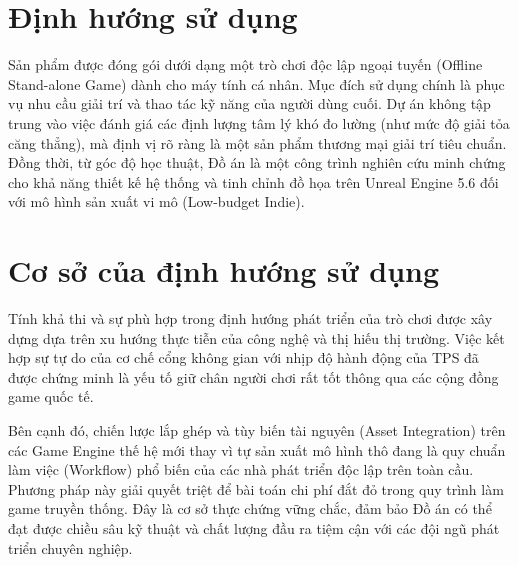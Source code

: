\documentclass[../DoAn.tex]{subfiles}
\begin{document}
\section{Định hướng sử dụng}
\label{section:2.3}
Sản phẩm được đóng gói dưới dạng một trò chơi độc lập ngoại tuyến (Offline Stand-alone Game) dành cho máy tính cá nhân. Mục đích sử dụng chính là phục vụ nhu cầu giải trí và thao tác kỹ năng của người dùng cuối. Dự án không tập trung vào việc đánh giá các định lượng tâm lý khó đo lường (như mức độ giải tỏa căng thẳng), mà định vị rõ ràng là một sản phẩm thương mại giải trí tiêu chuẩn. Đồng thời, từ góc độ học thuật, Đồ án là một công trình nghiên cứu minh chứng cho khả năng thiết kế hệ thống và tinh chỉnh đồ họa trên Unreal Engine 5.6 đối với mô hình sản xuất vi mô (Low-budget Indie).

\section{Cơ sở của định hướng sử dụng}
\label{section:2.4}
Tính khả thi và sự phù hợp trong định hướng phát triển của trò chơi được xây dựng dựa trên xu hướng thực tiễn của công nghệ và thị hiếu thị trường. Việc kết hợp sự tự do của cơ chế cổng không gian với nhịp độ hành động của TPS đã được chứng minh là yếu tố giữ chân người chơi rất tốt thông qua các cộng đồng game quốc tế.

Bên cạnh đó, chiến lược lắp ghép và tùy biến tài nguyên (Asset Integration) trên các Game Engine thế hệ mới thay vì tự sản xuất mô hình thô đang là quy chuẩn làm việc (Workflow) phổ biến của các nhà phát triển độc lập trên toàn cầu. Phương pháp này giải quyết triệt để bài toán chi phí đắt đỏ trong quy trình làm game truyền thống. Đây là cơ sở thực chứng vững chắc, đảm bảo Đồ án có thể đạt được chiều sâu kỹ thuật và chất lượng đầu ra tiệm cận với các đội ngũ phát triển chuyên nghiệp.
\end{document}
